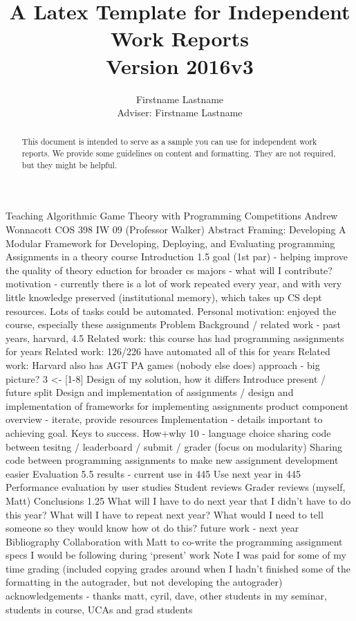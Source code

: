\documentclass[pageno]{jpaper}
\begin{document}
\title{
A Latex Template for Independent Work Reports\\
Version 2016v3}

\author{Firstname Lastname\\Adviser: Firstname Lastname}

\date{}
\maketitle

\thispagestyle{empty}
\doublespacing
\begin{abstract}
This document is intended to serve as a sample you can use for independent work reports.  We provide some guidelines on content and formatting.  They are not required, but they might be helpful.
\end{abstract}


Teaching Algorithmic Game Theory with Programming Competitions
Andrew Wonnacott
COS 398 IW 09 (Professor Walker)
Abstract
Framing: Developing A Modular Framework for Developing, Deploying, and Evaluating programming Assignments in a theory course
Introduction 1.5
goal (1st par) - helping improve the quality of theory eduction for broader cs majors - what will I contribute?
motivation - currently there is a lot of work repeated every year, and with very little knowledge preserved (institutional memory), which takes up CS dept resources. Lots of tasks could be automated. Personal motivation: enjoyed the course, especially these assignments
Problem Background / related work - past years, harvard, 4.5
Related work: this course has had programming assignments for years
Related work: 126/226 have automated all of this for years
Related work: Harvard also has AGT PA games (nobody else does)
approach - big picture? 3 <- [1-8]
Design of my solution, how it differs
Introduce present / future split
Design and implementation of assignments / design and implementation of frameworks for implementing assignments
product component overview
- iterate, provide resources
Implementation - details important to achieving goal. Keys to success. How+why 10
 - language choice
sharing code between tesitng / leaderboard / submit / grader (focus on modularity)
Sharing code between programming assignments to make new assignment development easier
Evaluation 5.5
results - current use in 445
Use next year in 445
Performance evaluation by user studies
Student reviews
Grader reviews (myself, Matt)
Conclusions 1.25
What will I have to do next year that I didn’t have to do this year?
What will I have to repeat next year?
What would I need to tell someone so they would know how ot do this?
future work - next year
Bibliography
Collaboration with Matt to co-write the programming assignment specs I would be following during ‘present’ work
Note I was paid for some of my time grading (included copying grades around when I hadn’t finished some of the formatting in the autograder, but not developing the autograder)
acknowledgements - thanks matt, cyril, dave, other students in my seminar, students in course, UCAs and grad students
\end{document}
